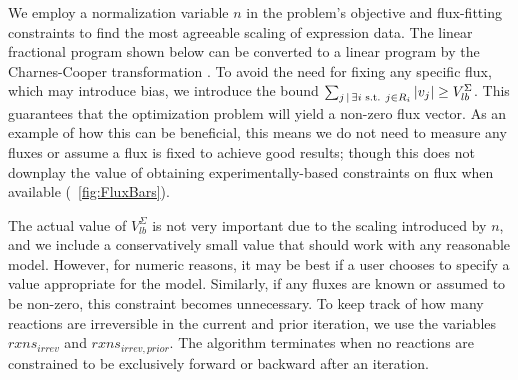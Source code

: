 We employ a normalization variable $n$ in the problem's objective and
flux-fitting constraints to find the most agreeable scaling of
expression data. The linear fractional program shown below can be
converted to a linear program by the Charnes-Cooper transformation
\citep{Boyd2004}. To avoid the need for fixing any specific flux, which
may introduce bias, we introduce the bound $\sum_{j \,\mid\, \exists i
\textnormal{{ }s.t.{ }} j\in R_i} \left|v_j\right| \geq
V_{lb}^{\Sigma}$. This guarantees that
the optimization problem will yield a non-zero flux vector. As an
example of how this can be beneficial, this means we do not need to
measure any fluxes or assume a flux is fixed to achieve good results;
though this does not downplay the value of obtaining
experimentally-based constraints on flux when available 
(\suppOrApp \Fig~\ref{fig:FluxBars}).

The actual value of $V_{lb}^{\Sigma}$ is not very important due to the
scaling introduced by $n$, and we include a conservatively small value
that should work with any reasonable model. However, for numeric
reasons, it may be best if a user chooses to specify a value
appropriate for the model. Similarly, if any fluxes are known or
assumed to be non-zero, this constraint becomes unnecessary. To keep
track of how many reactions are irreversible in the current and prior
iteration, we use the variables $rxns_{irrev}$ and
$rxns_{irrev,prior}$. The algorithm terminates when no reactions are
constrained to be exclusively forward or backward after an iteration.

